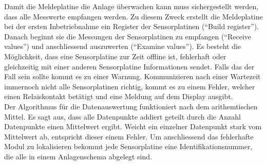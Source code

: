 \newpage
Damit die Meldeplatine die Anlage überwachen kann muss sichergestellt werden, dass alle Messwerte empfangen werden. Zu diesem Zweck erstellt die Meldeplatine bei der ersten Inbetriebnahme ein Register der Sensorplatinen (``Build register''). Danach beginnt sie die Messungen der Sensorplatinen zu empfangen (``Receive values'') und anschliessend auszuwerten (``Examine values''). Es besteht die Möglichkeit, dass eine Sensorplatine zur Zeit offline ist, fehlerhaft oder gleichzeitig mit einer anderen Sensorplatine Informationen sendet. Falls das der Fall sein sollte kommt es zu einer Warnung. Kommunizieren nach einer Wartezeit immernoch nicht alle Sensorplatinen richtig, kommt es zu einem Fehler, welcher einen Relaiskontakt betätigt und eine Meldung auf dem Display ausgibt.\\
Der Algorithmus für die Datenauswertung funktioniert nach dem arithemtischen Mittel. Es sagt aus, dass alle Datenpunkte addiert geteilt durch die Anzahl Datenpunkte einen Mittelwert ergibt. Weicht ein einzelner Datenpunkt stark vom Mittelwert ab, entspricht dieser einem Fehler. Um anschliessend das fehlerhafte Modul zu lokalisieren bekommt jede Sensorplatine eine Identifikationsnummer, die alle in einem Anlagenschema abgelegt sind.
%